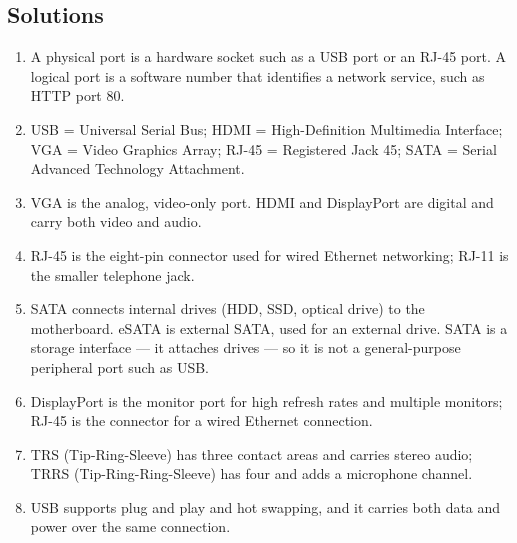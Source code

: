 \documentclass[11pt]{article}
\begin{document}
\subsection*{Solutions}
\begingroup\small
\begin{enumerate}[label=\arabic*.]
  \item A physical port is a hardware socket such as a USB port or an RJ-45
    port. A logical port is a software number that identifies a network
    service, such as HTTP port 80.
  \item USB = Universal Serial Bus; HDMI = High-Definition Multimedia
    Interface; VGA = Video Graphics Array; RJ-45 = Registered Jack 45;
    SATA = Serial Advanced Technology Attachment.
  \item VGA is the analog, video-only port. HDMI and DisplayPort are digital
    and carry both video and audio.
  \item RJ-45 is the eight-pin connector used for wired Ethernet networking;
    RJ-11 is the smaller telephone jack.
  \item SATA connects internal drives (HDD, SSD, optical drive) to the
    motherboard. eSATA is external SATA, used for an external drive. SATA is a
    storage interface --- it attaches drives --- so it is not a
    general-purpose peripheral port such as USB.
  \item DisplayPort is the monitor port for high refresh rates and multiple
    monitors; RJ-45 is the connector for a wired Ethernet connection.
  \item TRS (Tip-Ring-Sleeve) has three contact areas and carries stereo
    audio; TRRS (Tip-Ring-Ring-Sleeve) has four and adds a microphone channel.
  \item USB supports plug and play and hot swapping, and it carries both data
    and power over the same connection.
\end{enumerate}
\endgroup
\end{document}
